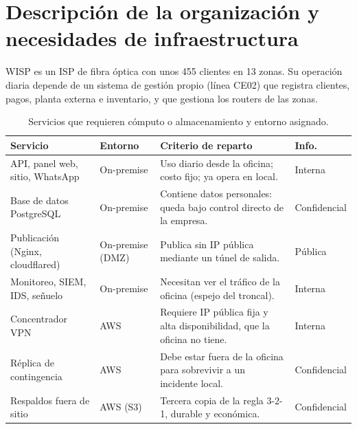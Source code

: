\section{Descripción de la organización y necesidades de infraestructura}

WISP es un ISP de fibra óptica con unos 455 clientes en 13 zonas. Su operación diaria
depende de un sistema de gestión propio (línea CE02) que registra clientes, pagos,
planta externa e inventario, y que gestiona los routers de las zonas.

\begin{table}[htbp]
\centering
\caption{Servicios que requieren cómputo o almacenamiento y entorno asignado.}
\label{tab:ce03-servicios-dc}
\small
\begin{tabularx}{\textwidth}{L{3.6cm}L{2.2cm}XL{1.6cm}}
\toprule
\textbf{Servicio} & \textbf{Entorno} & \textbf{Criterio de reparto} & \textbf{Info.} \\
\midrule
API, panel web, sitio, WhatsApp & On-premise & Uso diario desde la oficina; costo fijo; ya opera en local. & Interna \\
Base de datos PostgreSQL & On-premise & Contiene datos personales: queda bajo control directo de la empresa. & Confidencial \\
Publicación (Nginx, cloudflared) & On-premise (DMZ) & Publica sin IP pública mediante un túnel de salida. & Pública \\
Monitoreo, SIEM, IDS, señuelo & On-premise & Necesitan ver el tráfico de la oficina (espejo del troncal). & Interna \\
Concentrador VPN & AWS & Requiere IP pública fija y alta disponibilidad, que la oficina no tiene. & Interna \\
Réplica de contingencia & AWS & Debe estar fuera de la oficina para sobrevivir a un incidente local. & Confidencial \\
Respaldos fuera de sitio & AWS (S3) & Tercera copia de la regla 3-2-1, durable y económica. & Confidencial \\
\bottomrule
\end{tabularx}
\end{table}

